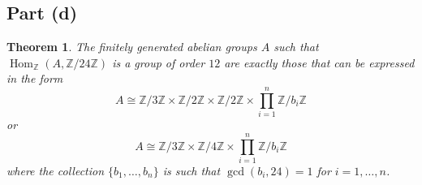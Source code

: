 \documentclass[10pt]{article}
\newtheorem{theorem}{Theorem}
\newcommand{\isom}{\cong}
\newcommand{\Hom}{\operatorname{Hom}}
\begin{document}
\subsection*{Part (d)}
\begin{theorem}
    The finitely generated abelian groups $A$ such that $\Hom_\mathbb{Z}(A,\mathbb{Z}/24\mathbb{Z})$
    is a group of order $12$
    are exactly those that can be expressed in the form
    \begin{equation*}
        A\isom \mathbb{Z}/3\mathbb{Z}\times\mathbb{Z}/2\mathbb{Z}\times\mathbb{Z}/2\mathbb{Z}\times\prod_{i=1}^n\mathbb{Z}/b_i\mathbb{Z}
    \end{equation*}
    or
    \begin{equation*}
        A\isom \mathbb{Z}/3\mathbb{Z}\times\mathbb{Z}/4\mathbb{Z}\times\prod_{i=1}^n\mathbb{Z}/b_i\mathbb{Z}
    \end{equation*}
    where the collection $\{b_1,\ldots,b_n\}$ is such that $\gcd(b_i,24) = 1$
    for $i = 1,\ldots,n$.
\end{theorem}
\end{document}
